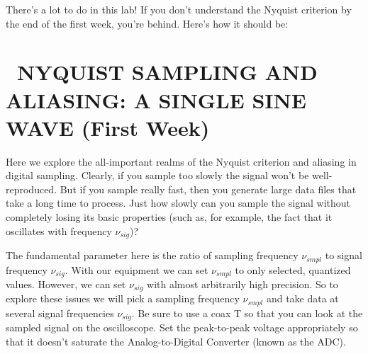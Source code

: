 \documentclass[11pt,preprint]{aastex}
\begin{document}
There's a lot to do in this lab! If you don't understand the Nyquist criterion
by the end of the first week, you're behind. Here's how it should be:

\section{\ NYQUIST SAMPLING AND ALIASING: A SINGLE SINE WAVE (First Week)} \label{nyquist}

	Here we explore the all-important realms of the Nyquist
criterion and aliasing in digital sampling.  Clearly, if you sample too
slowly the signal won't be well-reproduced.  But if you sample really
fast, then you generate large data files that take a long time to
process.  Just how slowly can you sample the signal without completely
losing its basic properties (such as, for example, the fact that it
oscillates with frequency $\nu_{sig}$)?

The fundamental parameter here is the ratio of sampling frequency
$\nu_{smpl}$ to signal frequency $\nu_{sig}$. With our equipment we can set
$\nu_{smpl}$ to only selected, quantized values. However, we can set
$\nu_{sig}$ with almost arbitrarily high precision. So to explore these
issues we will pick a sampling frequency $\nu_{smpl}$ and take data at
several signal frequencies $\nu_{sig}$.  Be sure to use a coax T so that
you can look at the sampled signal on the oscilloscope.  Set the
peak-to-peak voltage appropriately so that it doesn't saturate the
Analog-to-Digital Converter (known as the ADC).
\end{document}
